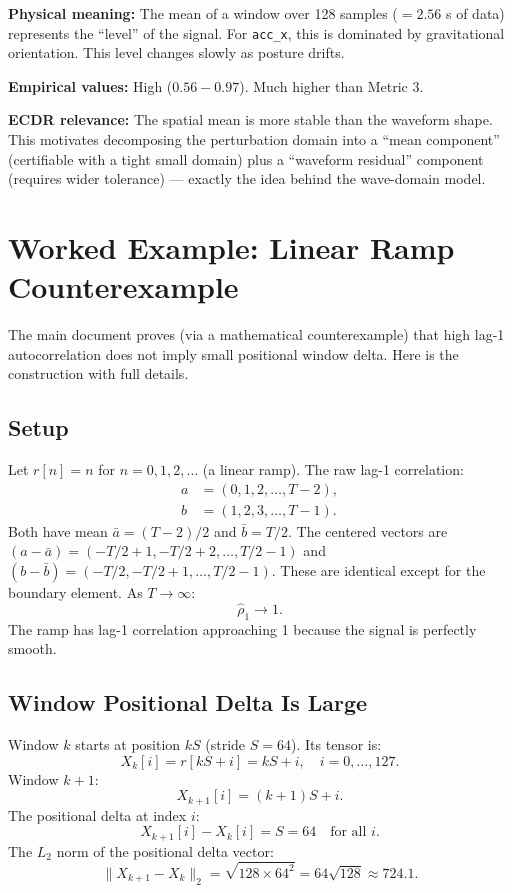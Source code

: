 \documentclass[11pt, a4paper]{article}
\theoremstyle{definition}
\theoremstyle{plain}
\newcommand{\code}[1]{\texttt{#1}}
\begin{document}
\textbf{Physical meaning:} The mean of a window over 128 samples ($= 2.56$ s of data)
represents the ``level'' of the signal. For \code{acc\_x}, this is dominated by
gravitational orientation. This level changes slowly as posture drifts.

\textbf{Empirical values:} High ($0.56 - 0.97$). Much higher than Metric 3.

\textbf{ECDR relevance:} The spatial mean is more stable than the waveform shape.
This motivates decomposing the perturbation domain into a ``mean component''
(certifiable with a tight small domain) plus a ``waveform residual'' component
(requires wider tolerance) — exactly the idea behind the wave-domain model.

\section{Worked Example: Linear Ramp Counterexample}

The main document proves (via a mathematical counterexample) that high lag-1
autocorrelation does not imply small positional window delta. Here is the
construction with full details.

\subsection{Setup}

Let $r[n] = n$ for $n = 0, 1, 2, \ldots$ (a linear ramp). The raw lag-1 correlation:
\begin{align}
  a &= (0, 1, 2, \ldots, T-2), \\
  b &= (1, 2, 3, \ldots, T-1).
\end{align}
Both have mean $\bar{a} = (T-2)/2$ and $\bar{b} = T/2$. The centered vectors are
$(a - \bar{a}) = (-T/2+1, -T/2+2, \ldots, T/2-1)$ and $(b - \bar{b}) = (-T/2, -T/2+1, \ldots, T/2-1)$.
These are identical except for the boundary element. As $T \to \infty$:
\[
  \hat{\rho}_1 \to 1.
\]
The ramp has lag-1 correlation approaching 1 because the signal is perfectly smooth.

\subsection{Window Positional Delta Is Large}

Window $k$ starts at position $kS$ (stride $S = 64$). Its tensor is:
\[
  X_{k}[i] = r[kS + i] = kS + i, \quad i = 0, \ldots, 127.
\]
Window $k+1$:
\[
  X_{k+1}[i] = (k+1)S + i.
\]
The positional delta at index $i$:
\[
  X_{k+1}[i] - X_k[i] = S = 64 \quad \text{for all } i.
\]
The $L_2$ norm of the positional delta vector:
\[
  \|X_{k+1} - X_k\|_2 = \sqrt{128 \times 64^2} = 64\sqrt{128} \approx 724.1.
\]
\end{document}
